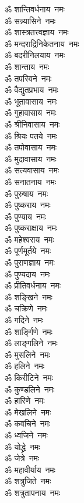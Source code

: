 \begin{multicols}{2}
\begin{flushleft}
ॐ शान्तिवर्धनाय~नमः\\
ॐ सन्न्यासिने~नमः\hfill{}\\
ॐ शास्त्रतत्त्वज्ञाय~नमः\\
ॐ मन्दराद्रिनिकेतनाय~नमः\\
ॐ बदरीनिलयाय~नमः\\
ॐ शान्ताय~नमः\\
ॐ तपस्विने~नमः\\
ॐ वैद्युतप्रभाय~नमः\\
ॐ भूतावासाय~नमः\\
ॐ गुहावासाय~नमः\\
ॐ श्रीनिवासाय~नमः\\
ॐ श्रियः पतये~नमः\hfill{}\\
ॐ तपोवासाय~नमः\\
ॐ मुदावासाय~नमः\\
ॐ सत्यवासाय~नमः\\
ॐ सनातनाय~नमः\\
ॐ पुरुषाय~नमः\\
ॐ पुष्कराय~नमः\\
ॐ पुण्याय~नमः\\
ॐ पुष्कराक्षाय~नमः\\
ॐ महेश्वराय~नमः\\
ॐ पूर्णमूर्तये~नमः\hfill{}\\
ॐ पुराणज्ञाय~नमः\\
ॐ पुण्यदाय~नमः\\
ॐ प्रीतिवर्धनाय~नमः\\
ॐ शङ्खिने~नमः\\
ॐ चक्रिणे~नमः\\
ॐ गदिने~नमः\\
ॐ शार्ङ्गिणे~नमः\\
ॐ लाङ्गलिने~नमः\\
ॐ मुसलिने~नमः\\
ॐ हलिने~नमः\hfill{}\\
ॐ किरीटिने~नमः\\
ॐ कुण्डलिने~नमः\\
ॐ हारिणे~नमः\\
ॐ मेखलिने~नमः\\
ॐ कवचिने~नमः\\
ॐ ध्वजिने~नमः\\
ॐ योद्ध्रे~नमः\\
ॐ जेत्रे~नमः\\
ॐ महावीर्याय~नमः\\
ॐ शत्रुजिते~नमः\hfill{}\\
ॐ शत्रुतापनाय~नमः\\

\end{flushleft}
\end{multicols}

